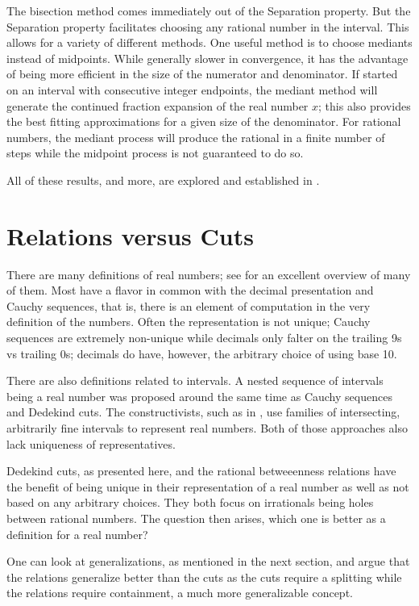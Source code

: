 \documentclass[12pt]{article}
\begin{document}
The bisection method comes immediately out of the Separation property. But the Separation property facilitates choosing any rational number in the interval. This allows for a variety of different methods. One useful method is to choose mediants instead of midpoints. While generally slower in convergence, it has the advantage of being more efficient in the size of the numerator and denominator. If started on an interval with consecutive integer endpoints, the mediant method will generate the continued fraction expansion of the real number $x$; this also provides the best fitting approximations for a given size of the denominator. For rational numbers, the mediant process will produce the rational in a finite number of steps while the midpoint process is not guaranteed to do so. 

All of these results, and more, are explored and established in \cite{taylor23main}.

\section{Relations versus Cuts}

There are many definitions of real numbers; see \cite{ittay-2015} for an excellent overview of many of them. Most have a flavor in common with the decimal presentation and Cauchy sequences, that is, there is an element of computation in the very definition of the numbers. Often the representation is not unique; Cauchy sequences are extremely non-unique while decimals only falter on the trailing 9s vs trailing 0s; decimals do have, however, the arbitrary choice of using base 10. 

There are also definitions related to intervals. A nested sequence of intervals being a real number was proposed around the same time as Cauchy sequences and Dedekind cuts. The constructivists, such as in \cite{bridger}, use families of intersecting, arbitrarily fine intervals to represent real numbers. Both of those approaches also lack uniqueness of representatives. 

Dedekind cuts, as presented here, and the rational betweeenness relations have the benefit of being unique in their representation of a real number as well as not based on any arbitrary choices. They both focus on irrationals being holes between rational numbers. The question then arises, which one is better as a definition for a real number? 

One can look at generalizations, as mentioned in the next section, and argue that the relations generalize better than the cuts as the cuts require a splitting while the relations require containment, a much more generalizable concept. 
\end{document}
